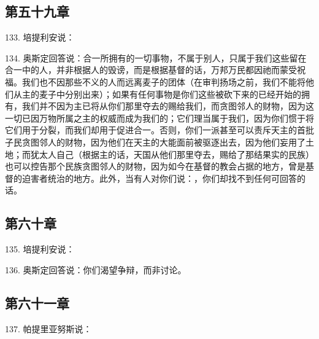 \subsection{第五十九章}

133. 培提利安说：\par

134. 奥斯定回答说：合一所拥有的一切事物，不属于别人，只属于我们这些留在合一中的人，并非根据人的毁谤，而是根据基督的话，万邦万民都因祂而蒙受祝福。我们也不因那些不义的人而远离麦子的团体（在审判扬场之前，我们不能将他们从主的麦子中分别出来）；如果有任何事物是你们这些被砍下来的已经开始的拥有，我们并不因为主已将从你们那里夺去的赐给我们，而贪图邻人的财物，因为这一切已因万物所属之主的权威而成为我们的；它们理当属于我们，因为你们惯于将它们用于分裂，而我们却用于促进合一。否则，你们一派甚至可以责斥天主的首批子民贪图邻人的财物，因为他们在天主的大能面前被驱逐出去，因为他们妄用了土地；而犹太人自己（根据主的话，天国从他们那里夺去，赐给了那结果实的民族）也可以控告那个民族贪图邻人的财物，因为如今在基督的教会占据的地方，曾是基督的迫害者统治的地方。此外，当有人对你们说：，你们却找不到任何可回答的话。\par


\subsection{第六十章}

135. 培提利安说：\par

136. 奥斯定回答说：你们渴望争辩，而非讨论。\par


\subsection{第六十一章}

137. 帕提里亚努斯说：\par

